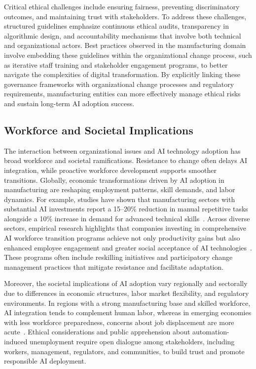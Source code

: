 \documentclass[sigconf]{acmart}
\begin{document}
Critical ethical challenges include ensuring fairness, preventing discriminatory outcomes, and maintaining trust with stakeholders. To address these challenges, structured guidelines emphasize continuous ethical audits, transparency in algorithmic design, and accountability mechanisms that involve both technical and organizational actors. Best practices observed in the manufacturing domain involve embedding these guidelines within the organizational change process, such as iterative staff training and stakeholder engagement programs, to better navigate the complexities of digital transformation. By explicitly linking these governance frameworks with organizational change processes and regulatory requirements, manufacturing entities can more effectively manage ethical risks and sustain long-term AI adoption success.

\subsection{Workforce and Societal Implications}

The interaction between organizational issues and AI technology adoption has broad workforce and societal ramifications. Resistance to change often delays AI integration, while proactive workforce development supports smoother transitions. Globally, economic transformations driven by AI adoption in manufacturing are reshaping employment patterns, skill demands, and labor dynamics. For example, studies have shown that manufacturing sectors with substantial AI investments report a 15--20\% reduction in manual repetitive tasks alongside a 10\% increase in demand for advanced technical skills~\cite{}. Across diverse sectors, empirical research highlights that companies investing in comprehensive AI workforce transition programs achieve not only productivity gains but also enhanced employee engagement and greater social acceptance of AI technologies~\cite{}. These programs often include reskilling initiatives and participatory change management practices that mitigate resistance and facilitate adaptation.

Moreover, the societal implications of AI adoption vary regionally and sectorally due to differences in economic structures, labor market flexibility, and regulatory environments. In regions with a strong manufacturing base and skilled workforce, AI integration tends to complement human labor, whereas in emerging economies with less workforce preparedness, concerns about job displacement are more acute~\cite{}. Ethical considerations and public apprehension about automation-induced unemployment require open dialogue among stakeholders, including workers, management, regulators, and communities, to build trust and promote responsible AI deployment.
\end{document}
